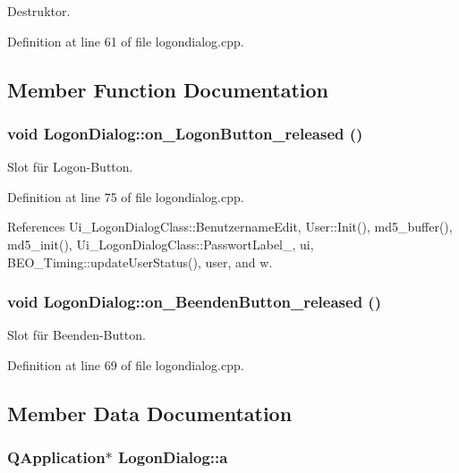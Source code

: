 Destruktor. 



Definition at line 61 of file logondialog.cpp.

\subsection{Member Function Documentation}
\hypertarget{class_logon_dialog_458c87e2493dd7421792e8141e65c5dd}{
\subsubsection[on\_\-LogonButton\_\-released]{\setlength{\rightskip}{0pt plus 5cm}void LogonDialog::on\_\-LogonButton\_\-released ()}}
\label{class_logon_dialog_458c87e2493dd7421792e8141e65c5dd}


Slot für Logon-Button. 



Definition at line 75 of file logondialog.cpp.

References Ui\_\-LogonDialogClass::BenutzernameEdit, User::Init(), md5\_\-buffer(), md5\_\-init(), Ui\_\-LogonDialogClass::PasswortLabel\_, ui, BEO\_\-Timing::updateUserStatus(), user, and w.\hypertarget{class_logon_dialog_6c66e4cb7c567b47f544080ae148b0b3}{
\subsubsection[on\_\-BeendenButton\_\-released]{\setlength{\rightskip}{0pt plus 5cm}void LogonDialog::on\_\-BeendenButton\_\-released ()}}
\label{class_logon_dialog_6c66e4cb7c567b47f544080ae148b0b3}


Slot für Beenden-Button. 



Definition at line 69 of file logondialog.cpp.

\subsection{Member Data Documentation}
\hypertarget{class_logon_dialog_cc6f7b558e791bdb79d0c522209306c2}{
\subsubsection[a]{\setlength{\rightskip}{0pt plus 5cm}QApplication$\ast$ {\bf LogonDialog::a}}}
\label{class_logon_dialog_cc6f7b558e791bdb79d0c522209306c2}




